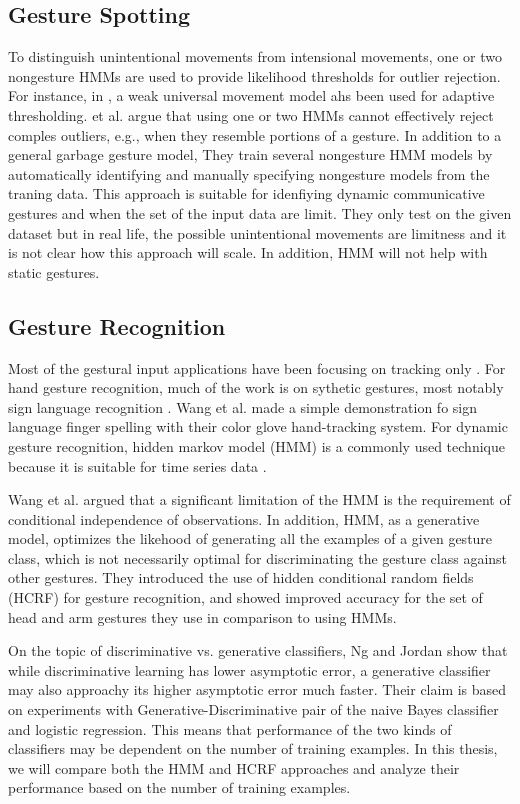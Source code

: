 \subsection{Gesture Spotting}
To distinguish unintentional movements from intensional
movements, one or two nongesture HMMs are used to provide likelihood
thresholds for outlier rejection. For instance, in \cite{yang07}, a weak
universal movement model ahs been used for adaptive thresholding. \cite{peng11}
et al. argue that using one or two HMMs cannot effectively reject comples
outliers, e.g., when they resemble portions of a gesture. In addition to a
general garbage gesture model, They train several nongesture HMM models by
automatically identifying and manually specifying nongesture models from the
traning data. This approach is suitable for idenfiying dynamic communicative
gestures and when the set of the input data are limit. They only test on the
given dataset but in real life, the possible unintentional movements are
limitness and it is not clear how this approach will scale. In addition, HMM
will not help with static gestures. 

\subsection{Gesture Recognition}
Most of the gestural input applications have been focusing on tracking only
\cite{harrison11} \cite{larson11}. For hand gesture recognition, much of the
work is on sythetic gestures, most notably sign language recognition
\cite{Bauer00} \cite{kadous02}. Wang et al. \cite{Wang09} made a simple
demonstration fo sign language finger spelling with their color glove hand-tracking system. 
For dynamic gesture recognition, hidden markov model (HMM) is a commonly used
technique because it is suitable for time series data \cite{sharma00}. 

Wang et al. \cite{wang06} argued that a significant limitation of the
HMM is the requirement of conditional independence of observations. In
addition, HMM, as a generative model, optimizes the likehood of
generating all the examples of a given gesture class, which is not
necessarily optimal for discriminating the gesture class against other
gestures. They introduced the use of hidden conditional random fields (HCRF) for
gesture recognition, and showed improved accuracy for the set of head and
arm gestures they use in comparison to using HMMs. 

On the topic of discriminative vs. generative classifiers, Ng and Jordan
\cite{ng02} show that while discriminative learning has lower asymptotic error,
a generative classifier may also approachy its higher asymptotic error much
faster. Their claim is based on experiments with Generative-Discriminative
pair of the naive Bayes classifier and logistic regression. This means that
performance of the two kinds of classifiers may be dependent on the number of training
examples. In this thesis, we will compare both the HMM and HCRF approaches and
analyze their performance based on the number of training examples.

